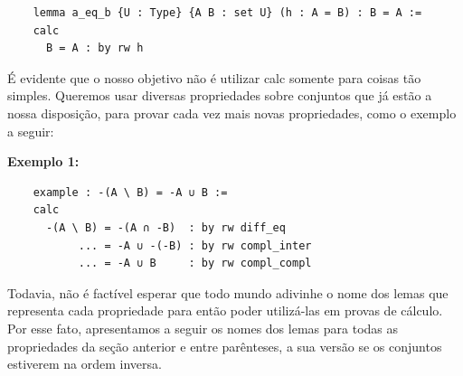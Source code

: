   \begin{lstlisting}
    lemma a_eq_b {U : Type} {A B : set U} (h : A = B) : B = A :=
    calc
      B = A : by rw h \end{lstlisting}

  É evidente que o nosso objetivo não é utilizar {\selectfont calc} somente para coisas tão simples. Queremos usar diversas propriedades sobre conjuntos que já estão a nossa disposição, para provar cada vez mais novas propriedades, como o exemplo a seguir:

  \textbf{Exemplo 1:}
  \begin{lstlisting}
    example : -(A \ B) = -A ∪ B :=
    calc
      -(A \ B) = -(A ∩ -B)  : by rw diff_eq
           ... = -A ∪ -(-B) : by rw compl_inter
           ... = -A ∪ B     : by rw compl_compl \end{lstlisting}


  Todavia, não é factível esperar que todo mundo adivinhe o nome dos lemas que representa cada propriedade para então poder utilizá-las em provas de cálculo. Por esse fato, apresentamos a seguir os nomes dos lemas para todas as propriedades da seção anterior e entre parênteses, a sua versão se os conjuntos estiverem na ordem inversa.

